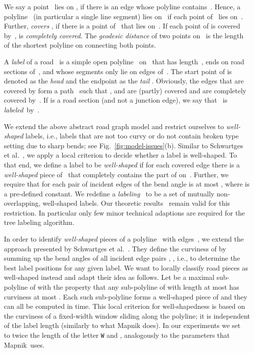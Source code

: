 \documentclass[a4paper,11pt]{article}
\begin{document}
We say a point~ lies on , if there is an edge  whose
polyline contains~. Hence, a polyline~ (in particular a
single line segment) lies on~ if each point of~ lies
on~. Further,  \emph{covers} , if there is a point
of~ that lies on~. If each point of  is covered by~,
 is \emph{completely covered}.  The \emph{geodesic distance} of two points
on~ is the length of the shortest polyline on  connecting both
points.

A \emph{label} of a road~ is a simple open polyline~ on~
that has length~, ends on road sections
of~, and whose segments only lie on edges of~.  The start point
of  is denoted as the \emph{head}  and the endpoint as
the \emph{tail} .  Obviously, the edges that are covered by
 form a path~
such that , and  are (partly) covered and
 are completely covered by~. If  is a road section (and not a junction
edge), we say that~ is \emph{labeled}~by~.


We extend the above abstract road graph model and restrict ourselves to \emph{well-shaped} labels, i.e., labels that are not too curvy or do not contain broken type setting due to sharp bends; see Fig.~\ref{fig:model-issues}(b). Similar to
  Schwartges et al.~\cite{swh-lsime-acm14}, we apply a local criterion
  to decide whether a label is well-shaped.
To that end, we define a label  to be \emph{well-shaped} if for each covered
edge  there is a \emph{well-shaped} piece of~
that completely contains the part of  on~.  Further, we
require that for each pair of incident edges of  the
bend angle is at most , where 
is a pre-defined constant. We redefine a \emph{labeling}~
to be a set of mutually non-overlapping, well-shaped labels.
Our theoretic results~\cite{rlTheory} remain valid for this
restriction. In particular only few minor technical adaptions are required for the tree labeling algorithm.

In order to identify \emph{well-shaped} pieces of a polyline~ with
edges~, we extend the approach presented
by Schwartges et al.~\cite{swh-lsime-acm14}. They define the curviness 
of  by summing up the bend angles  of all incident edge pairs
, , i.e.,  to determine the best label positions for any given label. We want to locally classify road pieces as well-shaped instead and adapt their idea as follows. 
Let  be a maximal sub-polyline of  with the property that any sub-polyline of  with length at most  has curviness at most . Each such sub-polyline  forms a well-shaped piece of  and they can all be computed in  time. 
This local criterion for well-shapedness is based on the curviness of a fixed-width window sliding along the polyline; it is independent of the label length (similarly to what Mapnik does). 
In our experiments we set~ to twice the length of the
letter \texttt{W} and , analogously to the parameters that Mapnik~uses.
\end{document}
